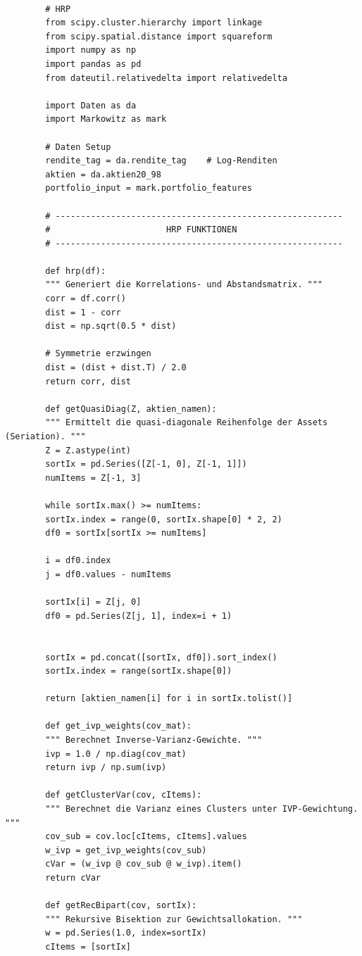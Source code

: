 \documentclass[parskip=half]{scrartcl}
\begin{document}
	\begin{lstlisting}[caption={HRP-Algorithmus}, label={lst:hrp_code}]
		
		# HRP 
		from scipy.cluster.hierarchy import linkage 
		from scipy.spatial.distance import squareform 
		import numpy as np 
		import pandas as pd 
		from dateutil.relativedelta import relativedelta 
		
		import Daten as da 
		import Markowitz as mark 
		
		# Daten Setup
		rendite_tag = da.rendite_tag    # Log-Renditen 
		aktien = da.aktien20_98 
		portfolio_input = mark.portfolio_features 
		
		# --------------------------------------------------------- 
		#                       HRP FUNKTIONEN
		# --------------------------------------------------------- 
		
		def hrp(df): 
		""" Generiert die Korrelations- und Abstandsmatrix. """ 
		corr = df.corr() 
		dist = 1 - corr 
		dist = np.sqrt(0.5 * dist) 
		
		# Symmetrie erzwingen
		dist = (dist + dist.T) / 2.0 
		return corr, dist 
		
		def getQuasiDiag(Z, aktien_namen): 
		""" Ermittelt die quasi-diagonale Reihenfolge der Assets (Seriation). """ 
		Z = Z.astype(int) 
		sortIx = pd.Series([Z[-1, 0], Z[-1, 1]]) 
		numItems = Z[-1, 3]  
		
		while sortIx.max() >= numItems: 
		sortIx.index = range(0, sortIx.shape[0] * 2, 2)  
		df0 = sortIx[sortIx >= numItems] 
		
		i = df0.index 
		j = df0.values - numItems 
		
		sortIx[i] = Z[j, 0]  
		df0 = pd.Series(Z[j, 1], index=i + 1) 
		
		
		sortIx = pd.concat([sortIx, df0]).sort_index()  
		sortIx.index = range(sortIx.shape[0]) 
		
		return [aktien_namen[i] for i in sortIx.tolist()] 
		
		def get_ivp_weights(cov_mat): 
		""" Berechnet Inverse-Varianz-Gewichte. """ 
		ivp = 1.0 / np.diag(cov_mat)  
		return ivp / np.sum(ivp) 
		
		def getClusterVar(cov, cItems): 
		""" Berechnet die Varianz eines Clusters unter IVP-Gewichtung. """ 
		cov_sub = cov.loc[cItems, cItems].values 
		w_ivp = get_ivp_weights(cov_sub) 
		cVar = (w_ivp @ cov_sub @ w_ivp).item() 
		return cVar 
		
		def getRecBipart(cov, sortIx): 
		""" Rekursive Bisektion zur Gewichtsallokation. """ 
		w = pd.Series(1.0, index=sortIx) 
		cItems = [sortIx] 
		

\end{lstlisting}
\end{document}

